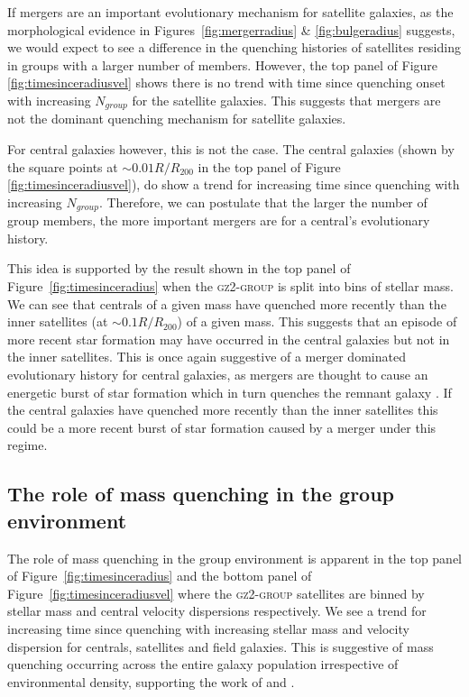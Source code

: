 If mergers are an important evolutionary mechanism for satellite galaxies, as the morphological evidence in Figures~\ref{fig:mergerradius} \& \ref{fig:bulgeradius} suggests, we would expect to see a difference in the quenching histories of satellites residing in groups with a larger number of members. However, the top panel of Figure \ref{fig:timesinceradiusvel} shows there is no trend with time since quenching onset with increasing $N_{group}$ for the satellite galaxies. This suggests that mergers are not the dominant quenching mechanism for satellite galaxies.

For central galaxies however, this is not the case. The central galaxies (shown by the square points at $\sim 0.01 R/R_{200}$ in the top panel of Figure \ref{fig:timesinceradiusvel}), do show a trend for increasing time since quenching with increasing $N_{group}$. Therefore, we can postulate that the larger the number of group members, the more important mergers are for a central's evolutionary history. 

This idea is supported by the result shown in the top panel of Figure~\ref{fig:timesinceradius} when the \textsc{gz2-group} is split into bins of stellar mass. We can see that centrals of a given mass have quenched more recently than the inner satellites (at $\sim0.1R/R_{200}$) of a given mass. This suggests that an episode of more recent star formation may have occurred in the central galaxies but not in the inner satellites. This is once again suggestive of a merger dominated evolutionary history for central galaxies, as mergers are thought to cause an energetic burst of star formation which in turn quenches the remnant galaxy \citep{hopkins05, treister12, pontzen16}. If the central galaxies have quenched more recently than the inner satellites this could be a more recent burst of star formation caused by a merger under this regime. 


\subsection{The role of mass quenching in the group environment}\label{sec:rolemassenv}

The role of mass quenching in the group environment is apparent in the top panel of Figure~\ref{fig:timesinceradius} and the bottom panel of Figure~\ref{fig:timesinceradiusvel} where the \textsc{gz2-group} satellites are binned by stellar mass and central velocity dispersions respectively. We see a trend for increasing time since quenching with increasing stellar mass and velocity dispersion for centrals, satellites and field galaxies. This is suggestive of mass quenching occurring across the entire galaxy population irrespective of environmental density, supporting the work of \citet{Peng10, gabor10, peng12} and \citet{darvish16}.


